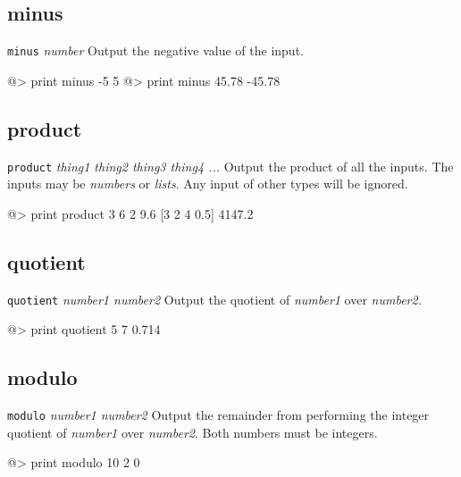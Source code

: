 \subsection*{minus}  
 
{\tt minus} {\it number} 
\newline\newline 
Output the negative value of the input.  
\begin{verbatimtab} 
@> print minus -5 
5 
@> print minus 45.78 
-45.78 
\end{verbatimtab}
 
\subsection*{product}  
 
{\tt product} {\it thing1 thing2 thing3 thing4 ...} 
\newline\newline 
Output the product of all the inputs.  The inputs may be {\it numbers} or {\it lists}. Any input of other types 
will be ignored. 
\begin{verbatimtab} 
@> print product 3 6 2 9.6 [3 2 4 0.5] 
4147.2 
\end{verbatimtab}
 
\subsection*{quotient}  
 
{\tt quotient} {\it number1 number2 } 
\newline\newline 
Output the quotient of {\it number1} over {\it number2.} 
\begin{verbatimtab} 
@> print quotient 5 7 
0.714 
\end{verbatimtab}
 
\subsection*{modulo}  
 
{\tt modulo} {\it number1 number2 } 
\newline\newline 
Output the remainder from performing the integer quotient of {\it number1} over {\it number2}. Both numbers must be integers. 
\begin{verbatimtab} 
@> print modulo 10 2 
0 
\end{verbatimtab}
 
